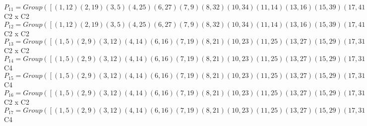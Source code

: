 \documentclass[varwidth=\maxdimen,border=10]{standalone}
\begin{document}
\begin{tabular}
$P_{11} = Group( [ ( 1,12)( 2,19)( 3, 5)( 4,25)( 6,27)( 7, 9)( 8,32)(10,34)(11,14)(13,16)(15,39)(17,41)(18,21)(20,23)(22,43)(24,45)(26,29)(28,31)(30,47)(33,36)(35,38)(37,48)(40,42)(44,46), ( 1, 2)( 3, 7)( 4, 8)( 5, 9)( 6,24)(10,17)(11,18)(12,19)(13,35)(14,21)(15,37)(16,38)(20,28)(22,30)(23,31)(25,32)(26,44)(27,45)(29,46)(33,40)(34,41)(36,42)(39,48)(43,47) ] )\cong$ C2 x C2\ \\
$P_{12} = Group( [ ( 1,12)( 2,19)( 3, 5)( 4,25)( 6,27)( 7, 9)( 8,32)(10,34)(11,14)(13,16)(15,39)(17,41)(18,21)(20,23)(22,43)(24,45)(26,29)(28,31)(30,47)(33,36)(35,38)(37,48)(40,42)(44,46), ( 1, 9)( 2, 5)( 3,19)( 4,21)( 6,38)( 7,12)( 8,14)(10,31)(11,32)(13,45)(15,46)(16,24)(17,23)(18,25)(20,41)(22,42)(26,48)(27,35)(28,34)(29,37)(30,36)(33,47)(39,44)(40,43) ] )\cong$ C2 x C2\ \\
$P_{13} = Group( [ ( 1, 5)( 2, 9)( 3,12)( 4,14)( 6,16)( 7,19)( 8,21)(10,23)(11,25)(13,27)(15,29)(17,31)(18,32)(20,34)(22,36)(24,38)(26,39)(28,41)(30,42)(33,43)(35,45)(37,46)(40,47)(44,48), ( 1, 7)( 2, 3)( 4,18)( 5,19)( 6,35)( 8,11)( 9,12)(10,28)(13,24)(14,32)(15,44)(16,45)(17,20)(21,25)(22,40)(23,41)(26,37)(27,38)(29,48)(30,33)(31,34)(36,47)(39,46)(42,43) ] )\cong$ C2 x C2\ \\
$P_{14} = Group( [ ( 1, 5)( 2, 9)( 3,12)( 4,14)( 6,16)( 7,19)( 8,21)(10,23)(11,25)(13,27)(15,29)(17,31)(18,32)(20,34)(22,36)(24,38)(26,39)(28,41)(30,42)(33,43)(35,45)(37,46)(40,47)(44,48), ( 1, 8, 5,21)( 2, 4, 9,14)( 3,18,12,32)( 6,37,16,46)( 7,11,19,25)(10,30,23,42)(13,44,27,48)(15,38,29,24)(17,22,31,36)(20,40,34,47)(26,45,39,35)(28,33,41,43) ] )\cong$ C4\ \\
$P_{15} = Group( [ ( 1, 5)( 2, 9)( 3,12)( 4,14)( 6,16)( 7,19)( 8,21)(10,23)(11,25)(13,27)(15,29)(17,31)(18,32)(20,34)(22,36)(24,38)(26,39)(28,41)(30,42)(33,43)(35,45)(37,46)(40,47)(44,48), ( 1,18, 5,32)( 2,11, 9,25)( 3, 8,12,21)( 4,19,14, 7)( 6,44,16,48)(10,40,23,47)(13,37,27,46)(15,45,29,35)(17,33,31,43)(20,30,34,42)(22,41,36,28)(24,26,38,39) ] )\cong$ C4\ \\
$P_{16} = Group( [ ( 1, 5)( 2, 9)( 3,12)( 4,14)( 6,16)( 7,19)( 8,21)(10,23)(11,25)(13,27)(15,29)(17,31)(18,32)(20,34)(22,36)(24,38)(26,39)(28,41)(30,42)(33,43)(35,45)(37,46)(40,47)(44,48), ( 1, 2)( 3, 7)( 4, 8)( 5, 9)( 6,24)(10,17)(11,18)(12,19)(13,35)(14,21)(15,37)(16,38)(20,28)(22,30)(23,31)(25,32)(26,44)(27,45)(29,46)(33,40)(34,41)(36,42)(39,48)(43,47) ] )\cong$ C2 x C2\ \\
$P_{17} = Group( [ ( 1, 5)( 2, 9)( 3,12)( 4,14)( 6,16)( 7,19)( 8,21)(10,23)(11,25)(13,27)(15,29)(17,31)(18,32)(20,34)(22,36)(24,38)(26,39)(28,41)(30,42)(33,43)(35,45)(37,46)(40,47)(44,48), ( 1, 4, 5,14)( 2, 8, 9,21)( 3,11,12,25)( 6,15,16,29)( 7,18,19,32)(10,22,23,36)(13,26,27,39)(17,30,31,42)(20,33,34,43)(24,37,38,46)(28,40,41,47)(35,44,45,48) ] )\cong$ C4\ \\

\end{tabular}
\end{document}
